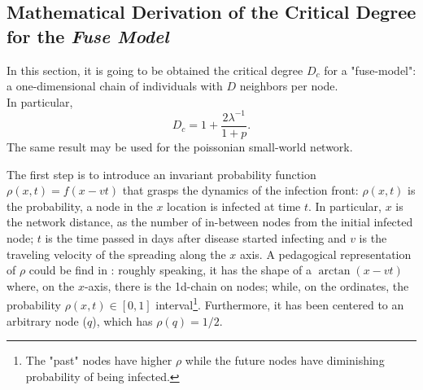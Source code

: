 \documentclass[a4paper,10pt,twoside]{book} %
\theoremstyle{definition}
\begin{document}
\subsection*{Mathematical Derivation of the Critical Degree for the \textit{Fuse Model} }

In this section, it is going to be obtained the critical degree $ D_c$  \cite{Thurner::NetBasedExpl} for a "fuse-model": a one-dimensional chain of individuals with $D$ neighbors per node.
\\In particular, 
\begin{equation}
	D_c = 1 + \frac{2 \lambda^{-1}}{1+p}.
	\label{eq:prelim_Dc_fusemodel}
\end{equation}
The same result may be used for the poissonian small-world network.

The first step is to introduce an invariant probability function $\rho(x,t) = f(x-vt)$ that grasps the dynamics of the infection front: $\rho(x,t)$ is the probability, a node in the $x$ location is infected at time $t$.
In particular, $x$ is the network distance, as the number of in-between nodes from the initial infected node; $t$ is the time passed in days after disease started infecting and $v$ is the traveling velocity of the spreading along the $x$ axis.
A pedagogical representation of $\rho$ could be find in \cite{Thurner::Appendix_NetBasedExpl}: roughly speaking, it has the shape of a $\arctan(x-vt)$ where, on the $x$-axis, there is the 1d-chain on  nodes; while, on the ordinates, the probability $ \rho(x,t)\in [0,1]$ interval\footnote{The "past" nodes have higher $\rho$ while the future nodes have diminishing probability of being infected.}. Furthermore, it has been centered to an arbitrary node ($q$), which has $\rho(q) = 1/2$.
\end{document}
